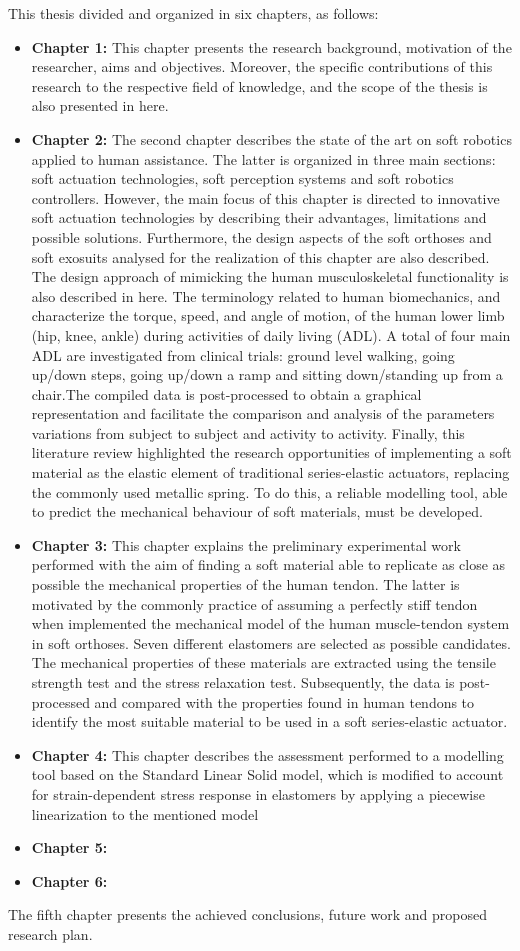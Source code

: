 This thesis divided and organized in six chapters, as follows:
\begin{itemize}
    \item {\bf Chapter 1: } This chapter presents the research background, motivation of the researcher, aims and objectives. Moreover, the specific contributions of this research to the respective field of knowledge, and the scope of the thesis is also presented in here.
    \item {\bf Chapter 2:} The second chapter describes the state of the art on soft robotics applied to human assistance. The latter is organized in three main sections: soft actuation technologies, soft perception systems and soft robotics controllers. However, the main focus of this chapter is directed to innovative soft actuation technologies by describing their advantages, limitations and possible solutions. Furthermore, the design aspects of the soft orthoses and soft exosuits analysed for the realization of this chapter are also described. The design approach of mimicking the human musculoskeletal functionality is also described in here. The terminology related to human biomechanics, and characterize the torque, speed, and angle of motion, of the human lower limb (hip, knee, ankle) during activities of daily living (ADL). A total of four main ADL are investigated from clinical trials: ground level walking, going up/down steps, going up/down a ramp and sitting down/standing up from a chair.The compiled data is post-processed to obtain a graphical representation and facilitate the comparison and analysis of the parameters variations from subject to subject and activity to activity. Finally, this literature review highlighted the research opportunities of implementing a soft material as the elastic element of traditional series-elastic actuators, replacing the commonly used metallic spring. To do this, a reliable modelling tool, able to predict the mechanical behaviour of soft materials, must be developed.
    \item {\bf Chapter 3: } This chapter explains the preliminary experimental work performed with the aim of finding a soft material able to replicate as close as possible the mechanical properties of the human tendon. The latter is motivated by the commonly practice of assuming a perfectly stiff tendon when implemented the mechanical model of the human muscle-tendon system in soft orthoses. Seven different elastomers are selected as possible candidates. The mechanical properties of these materials are extracted using the tensile strength test and the stress relaxation test. Subsequently, the data is post-processed and compared with the properties found in human tendons to identify the most suitable material to be used in a soft series-elastic actuator.
    \item {\bf Chapter 4: } This chapter describes the assessment performed to a modelling tool based on the Standard Linear Solid model, which is modified to account for strain-dependent stress response in elastomers by applying a piecewise linearization to the mentioned model
    \item {\bf Chapter 5: }
    \item {\bf Chapter 6: }
\end{itemize}






The fifth chapter presents the achieved conclusions, future work and proposed research plan.